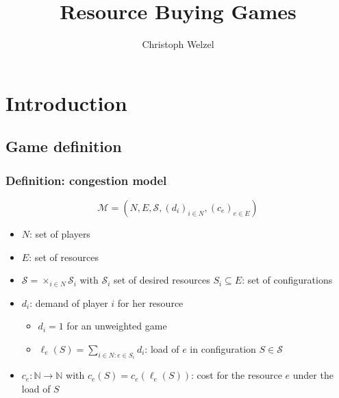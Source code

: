 \documentclass{beamer}
\title{Resource Buying Games}
\author[C. Welzel]{Christoph Welzel}
\newcommand{\tupel}[1]{\left(#1\right)}
\begin{document}
\maketitle
\section{Introduction}
\begin{frame}
\end{frame}

\subsection{Game definition}
\begin{frame}
  \frametitle{Definition: congestion model}
  \begin{equation*}
    \mathcal{M} = \tupel{N, E, \mathcal{S}, \left(d_{i}\right)_{i\in N},
    \left(c_{e}\right)_{e\in E}}
  \end{equation*}
  \vspace{-1cm}
  \begin{itemize}
    \item $N$: set of players
    \item $E$: set of resources
    \item $\mathcal{S} = \times_{i\in N}\mathcal{S}_{i}$ with $\mathcal{S}_{i}$
      set of desired resources $S_{i}\subseteq E$: set of configurations
    \item $d_{i}$: demand of player $i$ for her resource
      \begin{itemize}
        \item $d_{i} = 1$ for an unweighted game
        \item $\ell_{e}(S) = \sum_{i\in N:e\in S_{i}}d_{i}$: load of $e$
          in configuration $S\in\mathcal{S}$
      \end{itemize}
    \item $c_{e}:\mathbb{N}\rightarrow\mathbb{N}$ with
      $c_{e}(S) = c_{e}(\ell_{e}(S))$: cost for the resource $e$ under the load
      of $S$
  \end{itemize}
\end{frame}
\end{document}
